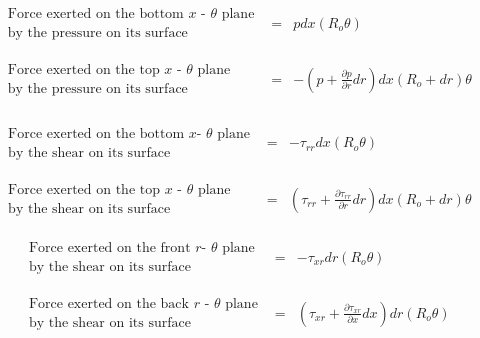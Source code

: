 \begin{displaymath}
	\begin{array}{ccc}
		\begin{array}{c}
		\textrm{Force exerted on the bottom $x$ - $\theta$ plane} \\
		\textrm{by the pressure on its surface}
		\end{array} & = &
		p dx (R_o \theta) \\
	& \\ & \\
		\begin{array}{c}
		\textrm{Force exerted on the top $x$ - $\theta$ plane}\\
		\textrm{by the pressure on its surface}
		\end{array} & = &
		-(p + \frac{\partial p}{\partial r}dr) dx (R_o + dr) \theta
	\end{array} 
\end{displaymath}
\\
\begin{displaymath}
	\begin{array}{ccc}
		\begin{array}{c}
		\textrm{Force exerted on the bottom $x$- $\theta$ plane} \\
		\textrm{by the shear on its surface}
		\end{array} & = &
		- \tau_{rr}dx (R_o \theta) \\
   	& \\ & \\
		\begin{array}{c}
		\textrm{Force exerted on the top $x$ - $\theta$ plane}\\
		\textrm{by the shear on its surface}
		\end{array} & = &
		(\tau_{rr} + \frac{\partial \tau_{rr}}{\partial r}dr) dx (R_o + dr) \theta
	\end{array}
\end{displaymath}

\begin{displaymath}
	\begin{array}{ccc}
		\begin{array}{c}
		\textrm{Force exerted on the front $r$- $\theta$ plane} \\
		\textrm{by the shear on its surface}
		\end{array} & = &
		- \tau_{xr}dr (R_o \theta) \\
   	& \\ & \\
		\begin{array}{c}
		\textrm{Force exerted on the back $r$ - $\theta$ plane}\\
		\textrm{by the shear on its surface}
		\end{array} & = &
		(\tau_{xr} + \frac{\partial \tau_{xr}}{\partial x}dx) dr (R_o \theta) 
	\end{array}
\end{displaymath}

